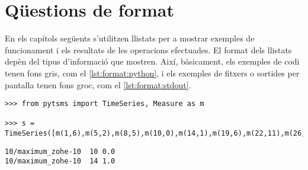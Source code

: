 \section{Qüestions de format}



En els capítols següents s'utilitzen llistats per a mostrar exemples
de funcionament i els resultats de les operacions efectuades.  El
format dels llistats depèn del tipus d'informació que mostren. Així,
bàsicament, els exemples de codi tenen fons gris, com el
\autoref{lst:format:python}, i els exemples de fitxers o sortides per
pantalla tenen fons groc, com el \autoref{lst:format:stdout}.



\begin{lstlisting}[style=py,caption=Exemple de codi,label=lst:format:python]
>>> from pytsms import TimeSeries, Measure as m

>>> s = TimeSeries([m(1,6),m(5,2),m(8,5),m(10,0),m(14,1),m(19,6),m(22,11),m(26,6),m(29,0)])
\end{lstlisting}



\begin{lstlisting}[style=stdout,caption=Exemple de fitxer o de sortida per pantalla,label=lst:format:stdout]
10/maximum_zohe-10	10 0.0
10/maximum_zohe-10	14 1.0
\end{lstlisting}




